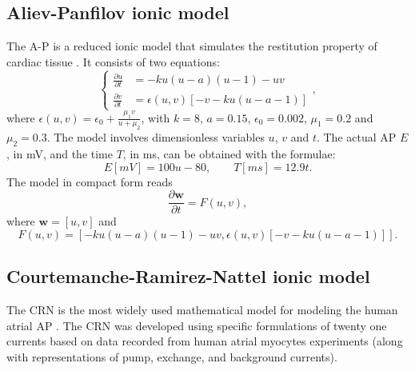 \documentclass[11pt,a4paper]{article}
\begin{document}
\subsection{Aliev-Panfilov ionic model}\label{subsec:aliev}
The A-P is a reduced ionic model that simulates the restitution property of cardiac tissue \cite{aliev1996simple}. It consists of two equations:
\begin{equation*}
\begin{cases}
\tfrac{\partial u}{\partial t} &= -ku(u-a)(u-1)-uv \\
\tfrac{\partial v}{\partial t} &= \epsilon(u,v)\left[ -v -ku(u-a-1)\right]
\end{cases},
\end{equation*}
where $\epsilon(u,v)=\epsilon_0+\tfrac{\mu_1 v}{u+\mu_2}$, with $k=8$, $a=0.15$, $\epsilon_0=0.002$, $\mu_1=0.2$ and $\mu_2=0.3$. The model involves dimensionless variables $u$, $v$ and $t$. The actual AP $E$, in mV, and the time $T$, in ms, can be obtained with the formulae:
$$E[mV]=100u-80, \qquad T[ms]=12.9t .$$
The model in compact form reads
\begin{equation}
\label{AP_compact}
\dfrac{\partial \mathbf{w}}{\partial t} = F(u,v),
\end{equation}
where $\mathbf{w}=[u,v]$ and $$F(u,v)=\left[-ku(u-a)(u-1)-uv,\epsilon(u,v)\left[ -v -ku(u-a-1)\right]\right].$$

\subsection{Courtemanche-Ramirez-Nattel ionic model}\label{subsec:crn}
The CRN is the most widely used mathematical model for modeling the human atrial AP \cite{courtemanche1998ionic}. The CRN was developed using specific formulations of twenty one currents based on data recorded from human atrial myocytes experiments (along with representations of pump, exchange, and background currents).
\end{document}
